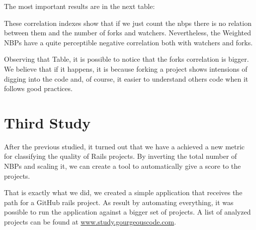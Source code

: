 The most important results are in the next table:


These correlation indexes show that if we just count the nbps there is no relation between them and the number of forks and watchers. Nevertheless, the Weighted NBPs have a quite perceptible negative correlation both with watchers and forks. 

Observing that Table, it is possible to notice that the forks correlation is bigger. 
We believe that if it happens, it is because forking a project shows intensions of digging into the code and, 
of course, it easier to understand others code when it follows good practices.




\section{Third Study}\label{subsec:thrid_study}
After the previous studied, it turned out that we have a achieved a new metric for classifying the quality of Rails projects.
By inverting the total number of NBPs and scaling it, we can create a tool to automatically give a score to the projects.

That is exactly what we did, we created a simple application that receives the path for a GitHub rails project. 
As result by automating everything, it was possible to run the application against a bigger set of projects.
A list of analyzed projects can be found at \url{www.study.gourgeouscode.com}.










